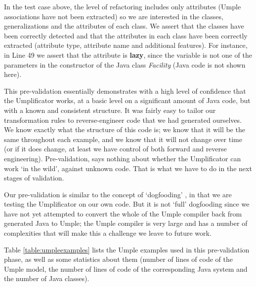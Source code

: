 In the test case above, the level of refactoring includes only attributes (Umple associations have not been extracted) so we are interested in the classes, generalizations and the attributes of each class. We assert that the classes have been correctly detected and that the attributes in each class have been correctly extracted (attribute type, attribute name and additional features). For instance, in Line 49 we assert that the attribute is \textbf{lazy}, since the variable is not one of the parameters in the constructor of the Java class \textit{Facility} (Java code is not shown here).

This pre-validation essentially demonstrates with a high level of confidence that the Umplificator works, at a basic level on a significant amount of Java code, but with a known and consistent structure. It was fairly easy to tailor our transformation rules to reverse-engineer code that we had generated ourselves. We know exactly what the structure of this code is; we know that it will be the same throughout each example, and we know that it will not change over time (or if it does change, at least we have control of both forward and reverse engineering). Pre-validation, says nothing about whether the Umplificator can work `in the wild', against unknown code. That is what we have to do in the next stages of validation.

Our pre-validation is similar to the concept of `dogfooding' \cite{ash2003web}, in that we are testing the Umplificator on our own code. But it is not `full' dogfooding since we have not yet attempted to convert the whole of the Umple compiler back from generated Java to Umple; the Umple compiler is very large and has a number of complexities that will make this a challenge we leave to future work.


Table \ref{table:umpleexamples} lists the Umple examples used in this pre-validation phase, as well as  some statistics about them (number of lines of code of the Umple model, the number of lines of code of the corresponding Java system and the number of Java classes).

